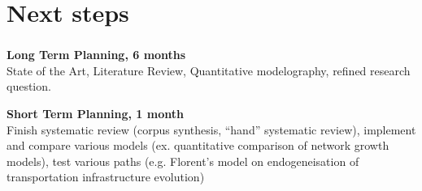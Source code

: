 



\section{Next steps}

\begin{frame}
\frametitle{}

\vfill{}
 \begin{justify}
\textbf{Long Term Planning, 6 months}\\
State of the Art, Literature Review, Quantitative modelography, refined research question.
\end{justify}

\vfill{}
 \begin{justify}
\textbf{Short Term Planning, 1 month}\\
Finish systematic review (corpus synthesis, ``hand'' systematic review), implement and compare various models (ex. quantitative comparison of network growth models), test various paths (e.g. Florent's model on endogeneisation of transportation infrastructure evolution)
\end{justify}

\vfill{}
\vfill{}





\end{frame}






